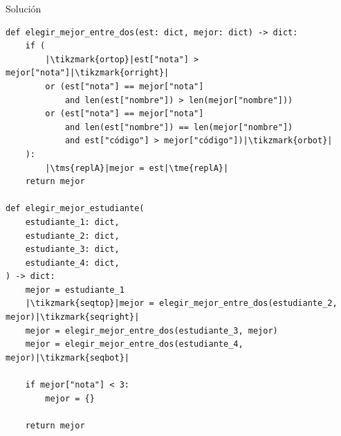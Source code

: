 \documentclass{ip-quiz}
\begin{document}
\begin{sectionbox}{Solución}
\begin{verbatim}
def elegir_mejor_entre_dos(est: dict, mejor: dict) -> dict:
    if (
        |\tikzmark{ortop}|est["nota"] > mejor["nota"]|\tikzmark{orright}|
        or (est["nota"] == mejor["nota"]
            and len(est["nombre"]) > len(mejor["nombre"]))
        or (est["nota"] == mejor["nota"]
            and len(est["nombre"]) == len(mejor["nombre"])
            and est["código"] > mejor["código"])|\tikzmark{orbot}|
    ):
        |\tms{replA}|mejor = est|\tme{replA}|
    return mejor

def elegir_mejor_estudiante(
    estudiante_1: dict,
    estudiante_2: dict,
    estudiante_3: dict,
    estudiante_4: dict,
) -> dict:
    mejor = estudiante_1
    |\tikzmark{seqtop}|mejor = elegir_mejor_entre_dos(estudiante_2, mejor)|\tikzmark{seqright}|
    mejor = elegir_mejor_entre_dos(estudiante_3, mejor)
    mejor = elegir_mejor_entre_dos(estudiante_4, mejor)|\tikzmark{seqbot}|

    if mejor["nota"] < 3:
        mejor = {}

    return mejor
\end{verbatim}

\end{sectionbox}
\end{document}
